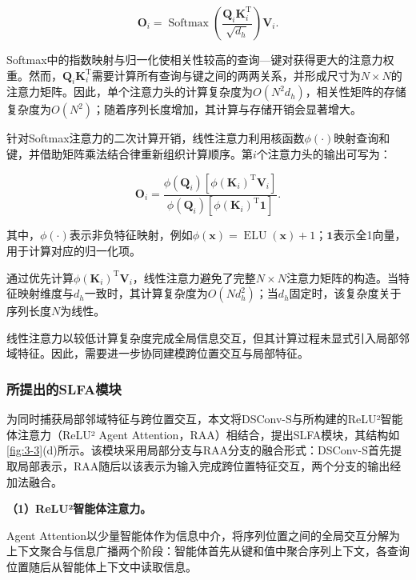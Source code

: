 \begin{equation}
\mathbf O_i
=
\operatorname{Softmax}
\left(
\frac{\mathbf Q_i\mathbf K_i^{\mathrm T}}{\sqrt{d_h}}
\right)
\mathbf V_i.
\label{eq:softmax_attention}
\end{equation}

Softmax中的指数映射与归一化使相关性较高的查询—键对获得更大的注意力权重\cite{ref34}。然而，$\mathbf Q_i\mathbf K_i^{\mathrm T}$需要计算所有查询与键之间的两两关系，并形成尺寸为$N\times N$的注意力矩阵。因此，单个注意力头的计算复杂度为$O(N^2d_h)$，相关性矩阵的存储复杂度为$O(N^2)$；随着序列长度增加，其计算与存储开销会显著增大\cite{ref34,ref39}。

针对Softmax注意力的二次计算开销，线性注意力利用核函数$\phi(\cdot)$映射查询和键，并借助矩阵乘法结合律重新组织计算顺序\cite{ref40}。第$i$个注意力头的输出可写为：

\begin{equation}
\mathbf O_i
=
\frac{
\phi(\mathbf Q_i)
\left[
\phi(\mathbf K_i)^{\mathrm T}\mathbf V_i
\right]
}{
\phi(\mathbf Q_i)
\left[
\phi(\mathbf K_i)^{\mathrm T}\mathbf 1
\right]
}.
\label{eq:linear_attention}
\end{equation}

其中，$\phi(\cdot)$表示非负特征映射，例如$\phi(\mathbf x)=\operatorname{ELU}(\mathbf x)+1$；$\mathbf 1$表示全1向量，用于计算对应的归一化项\cite{ref40}。

通过优先计算$\phi(\mathbf K_i)^{\mathrm T}\mathbf V_i$，线性注意力避免了完整$N\times N$注意力矩阵的构造。当特征映射维度与$d_h$一致时，其计算复杂度为$O(Nd_h^2)$；当$d_h$固定时，该复杂度关于序列长度$N$为线性\cite{ref40}。

线性注意力以较低计算复杂度完成全局信息交互，但其计算过程未显式引入局部邻域特征\cite{ref31,ref39,ref40,ref64}。因此，需要进一步协同建模跨位置交互与局部特征。

\subsubsection{所提出的SLFA模块}

为同时捕获局部邻域特征与跨位置交互，本文将DSConv-S与所构建的ReLU²智能体注意力（ReLU² Agent Attention，RAA）相结合，提出SLFA模块，其结构如\cref{fig:3-3}(d)所示。该模块采用局部分支与RAA分支的融合形式：DSConv-S首先提取局部表示，RAA随后以该表示为输入完成跨位置特征交互，两个分支的输出经加法融合。

\textbf{（1）ReLU²智能体注意力。}

Agent Attention以少量智能体作为信息中介，将序列位置之间的全局交互分解为上下文聚合与信息广播两个阶段\cite{ref46}：智能体首先从键和值中聚合序列上下文，各查询位置随后从智能体上下文中读取信息。


